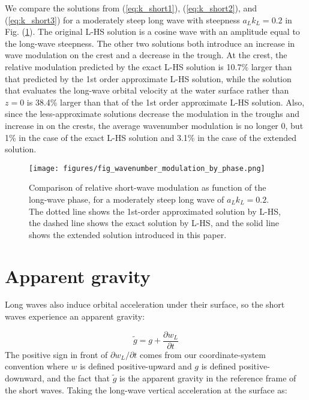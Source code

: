 \documentclass[draft]{agujournal2019}
\begin{document}
We compare the solutions from (\ref{eq:k_short1}), (\ref{eq:k_short2}),
and (\ref{eq:k_short3}) for a moderately steep long wave with steepness
$a_L k_L = 0.2$ in Fig. (\ref{fig:wavenumber_modulation}).
The original L-HS solution is a cosine wave with an amplitude equal
to the long-wave steepness.
The other two solutions both introduce an increase in wave modulation
on the crest and a decrease in the trough.
At the crest, the relative modulation predicted by the exact L-HS solution
is 10.7\% larger than that predicted by the 1st order approximate L-HS
solution, while the solution that evaluates the long-wave orbital velocity
at the water surface rather than $z = 0$ is 38.4\% larger than that of the
1st order approximate L-HS solution.
Also, since the less-approximate solutions decrease the modulation in the
troughs and increase in on the crests, the average wavenumber modulation
is no longer 0, but 1\% in the case of the exact L-HS solution and 3.1\% in the
case of the extended solution.

\begin{figure}[h]
\label{fig:wavenumber_modulation}
\centering
\texttt{[image: figures/fig\_wavenumber\_modulation\_by\_phase.png]}
\caption{
  Comparison of relative short-wave modulation as function of the
  long-wave phase, for a moderately steep long wave of $a_L k_L = 0.2$.
  The dotted line shows the 1st-order approximated solution by L-HS,
  the dashed line shows the exact solution by L-HS,
  and the solid line shows the extended solution introduced in this paper.
}
\end{figure}

\section{Apparent gravity}

Long waves also induce orbital acceleration under their surface, so the short
waves experience an apparent gravity:

\begin{equation}
\label{eq:apparent_gravity1}
\widetilde{g} = g + \dfrac{\partial w_L}{\partial t}
\end{equation}
The positive sign in front of $\partial w_L/\partial t$ comes from our
coordinate-system convention where $w$ is defined positive-upward and $g$ is
defined positive-downward, and the fact that $\widetilde{g}$ is the apparent
gravity in the reference frame of the short waves.
Taking the long-wave vertical acceleration at the surface as:
\end{document}
